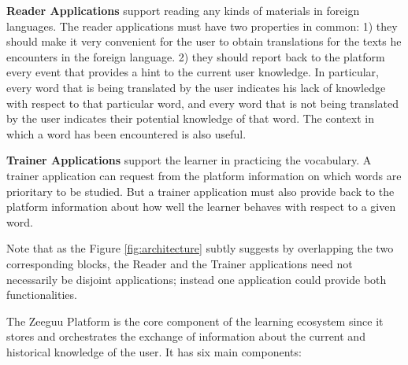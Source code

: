 \begin{description}
	
	\item {\bf Reader Applications} 
	support reading any kinds of materials in foreign languages. The reader applications must have two properties in common: 
		1) they should make it very convenient for the user to obtain translations for the texts he encounters in the foreign language. 
		2) they should report back to the platform every event that provides a hint to the current user knowledge. In particular, every word that is being translated by the user indicates his lack of knowledge with respect to that particular word, and every word that is not being translated by the user indicates their potential knowledge of that word. The context in which a word has been encountered is also useful. 
	
		\item {\bf Trainer Applications} support the learner in practicing the vocabulary. A trainer application can request from the platform information on which words are prioritary to be studied. But a trainer application must also provide back to the platform information about how well the learner behaves with respect to a given word.

\end{description}

Note that as the Figure \ref{fig:architecture} subtly suggests by overlapping the two corresponding blocks, the Reader and the Trainer applications need not necessarily be disjoint applications; instead one application could provide both functionalities.


The Zeeguu Platform is the core component of the learning ecosystem since it stores and orchestrates the exchange of information about the current and historical knowledge of the user. It has six main components: 

